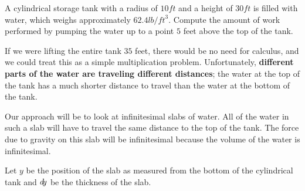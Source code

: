 \documentclass{ximera}
\begin{document}
\begin{example}
  A cylindrical storage tank with a radius of $10 \unit{ft}$ and a
  height of $30\unit{ft}$ is filled with water, which weighs
  approximately $62.4 \unit{lb}/\unit{ft}^3$. Compute the amount of
  work performed by pumping the water up to a point $5$ feet above the
  top of the tank.
  \begin{explanation}
    If we were lifting the entire tank $35$ feet, there would be no
    need for calculus, and we could treat this as a simple
    multiplication problem.  Unfortunately, \textbf{different parts of
      the water are traveling different distances}; the water at the
    top of the tank has a much shorter distance to travel than the
    water at the bottom of the tank.
	
    Our approach will be to look at infinitesimal slabs of water.  All
    of the water in such a slab will have to travel the same distance
    to the top of the tank.  The force due to gravity on this slab
    will be infinitesimal because the volume of the water is
    infinitesimal.
    
    Let $y$ be the position of the slab as measured from the bottom of
    the cylindrical tank and $\mathop{}\!d\! y$ be the thickness of the slab.

    \begin{image}
\end{image}
\end{explanation}
\end{example}
\end{document}
